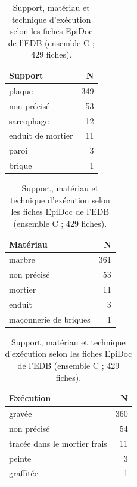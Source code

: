 \begin{table}[tbp]\centering\small\caption{Support, matériau et technique d’exécution selon les fiches EpiDoc de l’EDB (ensemble C ; 429 fiches).}\label{tab:supports}
\begin{tabular}[t]{@{}l r@{}}\toprule Support & N\\\midrule plaque & 349\\ non précisé & 53\\ sarcophage & 12\\ enduit de mortier & 11\\ paroi & 3\\ brique & 1\\\bottomrule\end{tabular}\hspace{1.2em}\begin{tabular}[t]{@{}l r@{}}\toprule Matériau & N\\\midrule marbre & 361\\ non précisé & 53\\ mortier & 11\\ enduit & 3\\ maçonnerie de briques & 1\\\bottomrule\end{tabular}\hspace{1.2em}\begin{tabular}[t]{@{}l r@{}}\toprule Exécution & N\\\midrule gravée & 360\\ non précisé & 54\\ tracée dans le mortier frais & 11\\ peinte & 3\\ graffitée & 1\\\bottomrule\end{tabular}\end{table}
